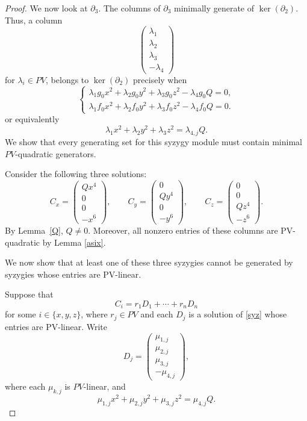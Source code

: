 \begin{proof}
We now look at $\partial_3$. 
The columns of $\partial_3$ minimally generate
of $\ker(\partial_2)$.  Thus, a column
\[
\begin{pmatrix}
\lambda_1\\
\lambda_2\\
\lambda_3\\
-\lambda_4
\end{pmatrix}
\]
for $\lambda_i\in PV$, belongs to $\ker(\partial_2)$ precisely when
\[
\begin{cases}
\lambda_1g_0x^2+\lambda_2g_0y^2+
\lambda_3g_0z^2-\lambda_4g_0Q=0,\\
\lambda_1f_0x^2+\lambda_2f_0y^2+
\lambda_3f_0z^2-\lambda_4f_0Q=0.
\end{cases}
\]
or equivalently
\begin{equation}\label{syz}
\lambda_1x^2+\lambda_{2}y^2+\lambda_{3}z^2
=\lambda_{4,j}Q.
\end{equation}
We show that every generating set for this syzygy module must contain minimal $PV$-quadratic generators.

Consider the following three solutions:
\[
C_x=
\begin{pmatrix}
Qx^4\\
0\\
0\\
-x^6
\end{pmatrix},
\qquad
C_y=
\begin{pmatrix}
0\\
Qy^4\\
0\\
-y^6
\end{pmatrix},
\qquad
C_z=
\begin{pmatrix}
0\\
0\\
Qz^4\\
-z^6
\end{pmatrix}.
\]
By Lemma~\ref{Q}, $Q\neq 0$. Moreover, all nonzero entries
of these columns are PV-quadratic by Lemma \ref{asix}.

We now show that at least one of these three syzygies cannot
be generated by syzygies whose entries are PV-linear.

Suppose that
\[
C_i=r_1D_1+\cdots+r_nD_n
\]
for some $i\in\{x,y,z\}$, where $r_j\in PV$ and each $D_j$
is a solution of \eqref{syz} whose entries are PV-linear. Write
\[
D_j=
\begin{pmatrix}
\mu_{1,j}\\
\mu_{2,j}\\
\mu_{3,j}\\
-\mu_{4,j}
\end{pmatrix},
\]
where each $\mu_{k,j}$ is $PV$-linear, and
\begin{equation}\label{syz}
\mu_{1,j}x^2+\mu_{2,j}y^2+\mu_{3,j}z^2
=\mu_{4,j}Q.
\end{equation}


\end{proof}
